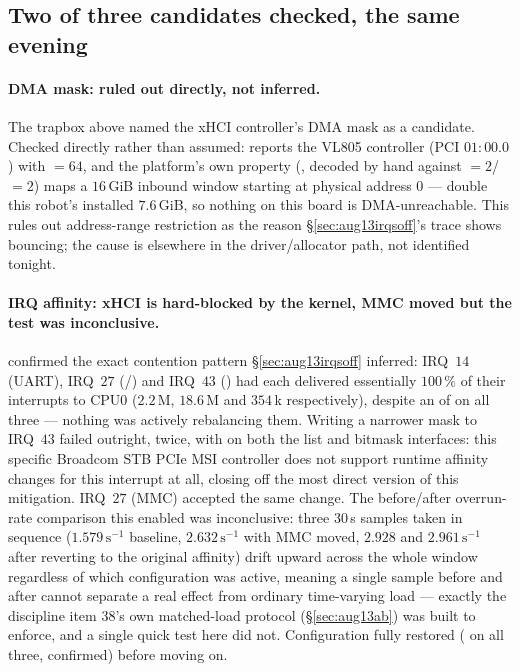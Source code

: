 \subsection{Two of three candidates checked, the same evening}

\paragraph{DMA mask: ruled out directly, not inferred.} The trapbox above
named the xHCI controller's DMA mask as a candidate. Checked directly
rather than assumed:  reports the VL805 controller
(PCI $01{:}00.0$) with  $=64$, and the platform's
own  property (,
decoded by hand against $=2$/$=2$)
maps a $16$\,GiB inbound window starting at physical address $0$ ---
double this robot's installed $7.6$\,GiB, so nothing on this board is
DMA-unreachable. This rules out address-range restriction as the reason
\S\ref{sec:aug13irqsoff}'s trace shows  bouncing; the cause
is elsewhere in the driver/allocator path, not identified tonight.

\paragraph{IRQ affinity: xHCI is hard-blocked by the kernel, MMC moved but the test was inconclusive.}
 confirmed the exact contention pattern
\S\ref{sec:aug13irqsoff} inferred: IRQ~$14$ (UART), IRQ~$27$
(/) and IRQ~$43$ () had each
delivered essentially $100\,\%$ of their interrupts to CPU0
($2.2$\,M, $18.6$\,M and $354$\,k respectively), despite an
 of  on all three --- nothing was
actively rebalancing them. Writing a narrower mask to IRQ~$43$ failed
outright, twice, with  on both the list and bitmask
interfaces: this specific Broadcom STB PCIe MSI controller does not
support runtime affinity changes for this interrupt at all, closing off
the most direct version of this mitigation. IRQ~$27$ (MMC) accepted the
same change. The before/after overrun-rate comparison this enabled was
inconclusive: three $30$\,s samples taken in sequence
($1.579\,\mathrm{s}^{-1}$ baseline, $2.632\,\mathrm{s}^{-1}$ with MMC
moved, $2.928$ and $2.961\,\mathrm{s}^{-1}$ after reverting to the
original affinity) drift upward across the whole window regardless of
which configuration was active, meaning a single sample before and
after cannot separate a real effect from ordinary time-varying load ---
exactly the discipline item 38's own matched-load protocol
(\S\ref{sec:aug13ab}) was built to enforce, and a single quick test here
did not. Configuration fully restored ( on all three,
confirmed) before moving on.

